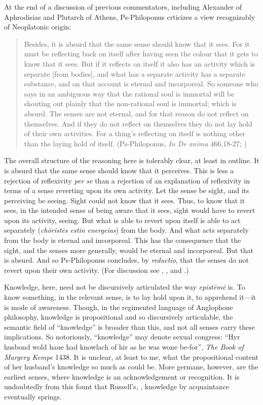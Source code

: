 At the end of a discussion of previous commentators, including Alexander of Aphrodisias and Plutarch of Athens, Ps-Philoponus crticizes a view recognizably of Neoplatonic origin:
\begin{quote}
	Besides, it is absurd that the same sense should know that it sees. For it must be reflecting back on itself after having seen the colour that it gets to know that it sees. But if it reflects on itself it also has an activity which is separate [from bodies], and what has a separate activity has a separate substance, and on that account is eternal and incorporeal. So someone who says in an ambiguous way that the rational soul is immortal will be shouting out plainly that the non-rational soul is immortal; which is absurd. The senses are not eternal, and for that reason do not reflect on themselves. And if they do not reflect on themselves they do not lay hold of their own activities. For a thing's reflecting on itself is nothing other than the laying hold of itself. (Ps-Philoponus, \emph{In De anima} 466,18-27; \citealt[]{Charlton:2013aa})
\end{quote}

The overall structure of the reasoning here is tolerably clear, at least in outline. It is absurd that the same sense should know that it perceives. This is less a rejection of reflexivity \emph{per se} than a rejection of an explanation of reflexivity in terms of a sense reverting upon its own activity. Let the sense be sight, and its perceiving be seeing. Sight could not know that it sees. Thus, to know that it sees, in the intended sense of being aware that it sees, sight would have to revert upon its activity, seeing. But what is able to revert upon itself is able to act separately (\emph{chōristēs estin energeias}) from the body. And what acts separately from the body is eternal and incorporeal. This has the consequence that the sight, and the senses more generally, would be eternal and incorporeal. But that is absurd. And so Ps-Philoponus concludes, by \emph{reductio}, that the senses do not revert upon their own activity. (For discussion see \citealt[158]{Bernard:1987hc}, \citealt[330–2]{Lautner:2014cz}, and \citealt[191-3]{Ierodiakonou:2022aa}.)

Knowledge, here, need not be discursively articulated the way \emph{epistēmē} is. To know something, in the relevant sense, is to lay hold upon it, to apprehend it—it is mode of awareness. Though, in the regimented language of Anglophone philosophy, knowledge is propositional and so discursively articulable, the semantic field of ``knowledge'' is broader than this, and not all senses carry these implications. So notoriously, ``knowledge'' may denote sexual congress: ``Hyr husbond wold haue had knowlach of hir as he was wone be-for'', \emph{The Book of Margery Kempe} 1438. It is unclear, at least to me, what the propositional content of her husband's knowledge so much as could be. More germane, however, are the earliest senses, where knowledge is an acknowledgement or recognition. It is undoubtedly from this fount that Russell's, \citeyearpar{Russell:1911kb}, knowledge by acquaintance eventually springs. 

